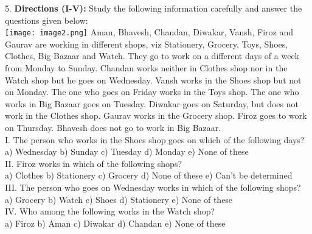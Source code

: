 \documentclass[
]{article}
\begin{document}
5. \textbf{Directions (I-V):} Study the following information carefully and answer the questions given
below:\\
\texttt{[image: image2.png]}
Aman, Bhavesh, Chandan, Diwakar, Vansh, Firoz and Gaurav are working in different
shops, viz Stationery, Grocery, Toys, Shoes, Clothes, Big Bazaar and Watch. They go to work
on a different days of a week from Monday to Sunday. Chandan works neither in Clothes
shop nor in the Watch shop but he goes on Wednesday. Vansh works in the Shoes shop but
not on Monday. The one who goes on Friday works in the Toys shop. The one who works in
Big Bazaar goes on Tuesday. Diwakar goes on Saturday, but does not work in the Clothes
shop. Gaurav works in the Grocery shop. Firoz goes to work on Thursday. Bhavesh does not
go to work in Big Bazaar.\\

I. The person who works in the Shoes shop goes on which of the following days?\\
a) Wednesday \hspace{2mm}b) Sunday \hspace{2mm}c) Tuesday \hspace{2mm}d) Monday \hspace{2mm}e) None of these\\

II. Firoz works in which of the following shops?\\
a) Clothes \hspace{2mm}b) Stationery \hspace{2mm}c) Grocery
\hspace{2mm}d) None of these \hspace{2mm}e) Can’t be determined\\

III. The person who goes on Wednesday works in which of the following shops?\\
a) Grocery \hspace{2mm}b) Watch \hspace{2mm}c) Shoes \hspace{2mm}d) Stationery \hspace{2mm}e) None of these\\

IV. Who among the following works in the Watch shop?\\
a) Firoz \hspace{2mm}b) Aman \hspace{2mm}c) Diwakar \hspace{2mm}d) Chandan \hspace{2mm}e) None of these\\
\end{document}
